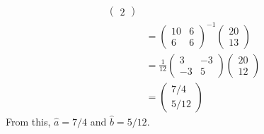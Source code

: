 \documentclass[12pt,twoside]{article}
\begin{document}
\begin{problems}
\begin{problemparts}
\begin{align*}
\begin{pmatrix}
    2 \end{pmatrix} \\
    &= \begin{pmatrix}
    10 & 6 \\
    6 & 6 \end{pmatrix}^{-1} \begin{pmatrix}
    20 \\
    13 \end{pmatrix} \\
    &= \frac{1}{12}\begin{pmatrix}
    3 & -3 \\
    -3 & 5 \end{pmatrix} \begin{pmatrix}
    20 \\
    12 \end{pmatrix} \\
    &= \begin{pmatrix}
    7/4 \\
    5/12 \end{pmatrix}
\end{align*}
From this, $\boxed{\hat{a} = 7/4}$ and $\boxed{\hat{b} = 5/12}$.

\problempart %


\end{problemparts}
\end{problems}
\end{document}
